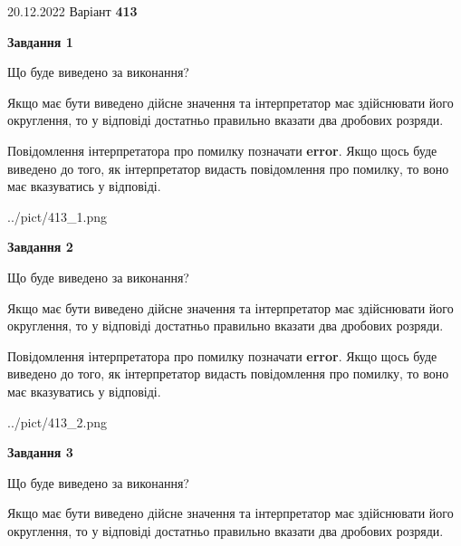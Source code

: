 \documentclass[12pt, ukrainian]{article}
\begin{document}
{20.12.2022 Варіант \No \textbf { 413 }\par}
{
\begin {Large}

{\begin {center}\textbf{Завдання 1}\end {center}}\par
Що буде виведено за виконання? \par

Якщо має бути виведено дійсне значення та інтерпретатор має здійснювати його округлення, 
то у відповіді достатньо правильно вказати два дробових розряди.

Повідомлення інтерпретатора про помилку позначати \textbf{error}.
Якщо щось буде виведено до того, як інтерпретатор видасть повідомлення про помилку, 
то воно має вказуватись у відповіді. \par

\begin{center}
	{../pict/413_1.png}
\end{center}
\newpage

{\begin {center}\textbf{Завдання 2}\end {center}}\par
Що буде виведено за виконання? \par

Якщо має бути виведено дійсне значення та інтерпретатор має здійснювати його округлення, 
то у відповіді достатньо правильно вказати два дробових розряди.

Повідомлення інтерпретатора про помилку позначати \textbf{error}.
Якщо щось буде виведено до того, як інтерпретатор видасть повідомлення про помилку, 
то воно має вказуватись у відповіді. \par

\begin{center}
	{../pict/413_2.png}
\end{center}
\newpage

{\begin {center}\textbf{Завдання 3}\end {center}}\par
Що буде виведено за виконання? \par

Якщо має бути виведено дійсне значення та інтерпретатор має здійснювати його округлення, 
то у відповіді достатньо правильно вказати два дробових розряди.


\end{Large}}
\end{document}
